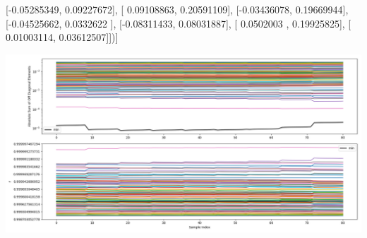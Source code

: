 \documentclass{article}
\begin{document}
       [-0.05285349,  0.09227672],
       [ 0.09108863,  0.20591109],
       [-0.03436078,  0.19669944],
       [-0.04525662,  0.0332622 ],
       [-0.08311433,  0.08031887],
       [ 0.0502003 ,  0.19925825],
       [ 0.01003114,  0.03612507]])]
\begin{center}
\includegraphics[scale=.9]{report_pickled_controls169/control_dpn_all.png}

\end{center}
\end{document}
